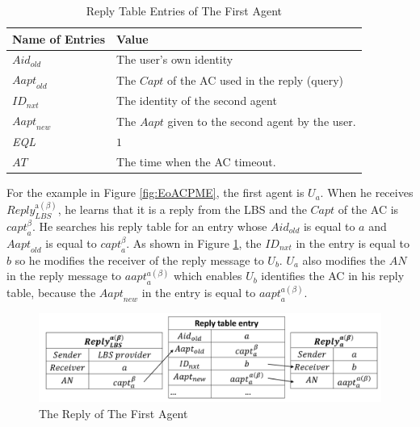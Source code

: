 \begin{table} [hbtp]
\caption{Reply Table Entries of The First Agent}
\label{table:RTEFirstAgt}
\centering
\tabulinesep=2mm
\begin{tabu} to 135 mm {|X[1,c]|X[3,l]|} \hline 
Name of Entries & Value \\ \hline 
${Aid}_{old}$ & The user's own identity \\ \hline 
${Aapt}_{old}$ & The $Capt$ of the AC used in the reply (query) \\ \hline 
${ID}_{nxt}$ & The identity of the second agent \\ \hline 
${Aapt}_{new}$ & The $Aapt$ given to the second agent by the user. \\ \hline 
\textit{EQL} & $1$ \\ \hline 
$AT$ & The time when the AC timeout. \\ \hline 
\end{tabu}
\end{table}

For the example in Figure \ref{fig:EoACPME}, the first agent is $U_a$. When he receives ${Reply}^{\mathrm{a}\left(\beta\right)}_{LBS}$, he learns that it is a reply from the LBS and the $Capt$ of the AC is ${capt}^{\beta}_a$. He searches his reply table for an entry whose ${Aid}_{old}$ is equal to $a$ and ${Aapt}_{old}$ is equal to ${capt}^{\beta }_a$. As shown in Figure \ref{fig:ReplyOfFirstAgent}, the ${ID}_{nxt}$ in the entry is equal to $b$ so he modifies the receiver of the reply message to $U_b$. $U_a$ also modifies the $AN$ in the reply message to ${aapt}^{a\left(\beta\right)}_a$ which enables $U_b$ identifies the AC in his reply table, because the ${Aapt}_{new}$ in the entry is equal to ${aapt}^{a\left(\beta\right)}_a$. 

\begin{figure} [H]
  \centering 
  \includegraphics[width=6.0in]{figures/FIG_4_7_The_Reply_of_The_First_Agent.png}
  \caption{The Reply of The First Agent} 
  \label{fig:ReplyOfFirstAgent} %
\end{figure}

